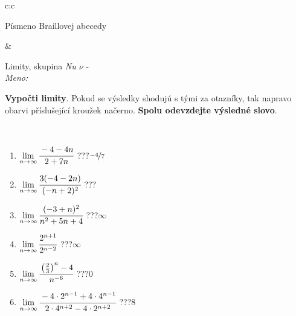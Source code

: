 \documentclass[10pt]{report}
\begin{document}
\begin{tabular}{c:c}
\begin{minipage}[c][104.5mm][t]{0.5\linewidth}
\begin{center}
\begin{minipage}{0.20\linewidth}
\begin{center}
{\small Písmeno Braillovej abecedy}
\end{center}
\end{minipage}
\end{center}
\end{minipage}
&
\begin{minipage}[c][104.5mm][t]{0.5\linewidth}
\begin{center}
\vspace{7mm}
{\huge Limity, skupina \textit{Nu $\nu$} -}\\[5mm]
\textit{Meno:}\phantom{xxxxxxxxxxxxxxxxxxxxxxxxxxxxxxxxxxxxxxxxxxxxxxxxxxxxxxxxxxxxxxxxx}\\[5mm]
\begin{minipage}{0.95\linewidth}
\begin{center}
\textbf{Vypočti limity}. Pokud se výsledky shodujú s tými za otazníky, tak napravo\\obarvi příslušející kroužek načerno. \textbf{Spolu odevzdejte výsledné slovo}.
\end{center}
\end{minipage}
\\[1mm]
\begin{minipage}{0.79\linewidth}
\begin{center}
\begin{varwidth}{\linewidth}
\begin{enumerate}
\normalsize
\item $\lim\limits_{n\to\infty}\cfrac{-4-4n}{2+7n}$\quad \dotfill\; ???\;\dotfill \quad $\nicefrac{-4}{7}$
\item $\lim\limits_{n\to\infty}\cfrac{3(-4-2n)}{(-n+2)^2}$\quad \dotfill\; ???\;\dotfill {}
\item $\lim\limits_{n\to\infty}\cfrac{(-3+n)^2}{n^2+5n+4}$\quad \dotfill\; ???\;\dotfill \quad $\infty$
\item $\lim\limits_{n\to\infty}\cfrac{2^{n+1}}{2^{n-2}}$\quad \dotfill\; ???\;\dotfill \quad $\infty$
\item $\lim\limits_{n\to\infty}\cfrac{\left(\frac{2}{3}\right)^n -4}{n^{-6}}$\quad \dotfill\; ???\;\dotfill \quad $0$
\item $\lim\limits_{n\to\infty}\cfrac{-4\cdot 2^{n-1}+4\cdot 4^{n-1}}{2\cdot 4^{n+2}-4\cdot 2^{n+2}}$\quad \dotfill\; ???\;\dotfill \quad $8$
\end{enumerate}
\end{varwidth}
\end{center}
\end{minipage}
\begin{minipage}{0.20\linewidth}

\end{minipage}
\end{center}
\end{minipage}
\end{tabular}
\end{document}
